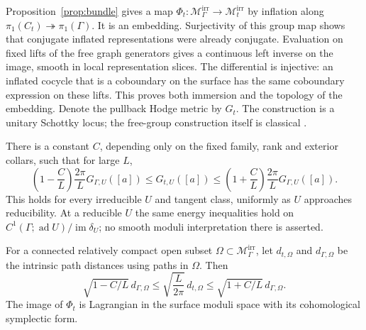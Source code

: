Proposition~\ref{prop:bundle} gives a map
$\Phi_t:\mathcal M_\Gamma^{\mathrm{irr}}
\to\mathcal M_t^{\mathrm{irr}}$ by inflation
along $\pi_1(C_t)\twoheadrightarrow\pi_1(\Gamma)$.
It is an embedding. Surjectivity of this
group map shows that conjugate inflated
representations were already conjugate.
Evaluation on fixed lifts of the free
graph generators gives a continuous left
inverse on the image, smooth in local
representation slices. The differential
is injective: an inflated cocycle that
is a coboundary on the surface has the
same coboundary expression on these lifts.
This proves both immersion and the
topology of the embedding.
Denote the pullback Hodge metric by $G_t$.
The construction is a unitary Schottky
locus; the free-group construction itself
is classical \cite[Section~3, Proposition~1]{florentino}.

\begin{theorem}\label{thm:moduli-metric}
There is a constant $C$, depending only
on the fixed family, rank and exterior
collars, such that for large $L$,
\begin{equation}\label{eq:moduli-metric}
 \left(1-\frac CL\right)\frac{2\pi}{L}
       G_{\Gamma,U}([a])
 \le G_{t,U}([a])
 \le
 \left(1+\frac CL\right)\frac{2\pi}{L}
       G_{\Gamma,U}([a]).
\end{equation}
This holds for every irreducible $U$
and tangent class, uniformly as $U$
approaches reducibility.
At a reducible $U$ the same energy
inequalities hold on
$C^1(\Gamma;\operatorname{ad}U)/
\operatorname{im}\delta_U$; no smooth
moduli interpretation there is asserted.

For a connected relatively compact open
subset $\Omega\subset\mathcal M_\Gamma^{\mathrm{irr}}$,
let $d_{t,\Omega}$ and $d_{\Gamma,\Omega}$
be the intrinsic path distances using
paths in $\Omega$. Then
\begin{equation}\label{eq:moduli-distance}
 \sqrt{1-C/L}\,d_{\Gamma,\Omega}
 \le\sqrt{\frac{L}{2\pi}}\,d_{t,\Omega}
 \le\sqrt{1+C/L}\,d_{\Gamma,\Omega}.
\end{equation}
The image of $\Phi_t$ is Lagrangian in
the surface moduli space with its
cohomological symplectic form.
\end{theorem}

